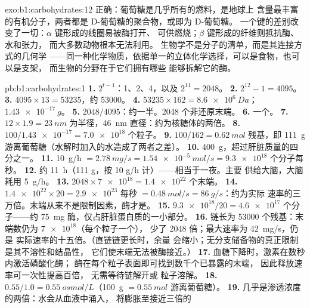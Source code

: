 \begin{solution}{exo:b1:carbohydrates:12}
正确：葡萄糖是几乎所有的燃料，是地球上
含量最丰富的有机分子，两者都是 D-葡萄糖的聚合物，或即为 D-葡萄糖。
一个键的差别改变了一切：$\alpha$ 键形成的线圈易被酶打开、
可供燃烧；$\beta$ 键形成的纤维则抵抗酶、水和张力，
而大多数动物根本无法利用。
生物学不是分子的清单，而是其连接方式的几何学
——同一种化学物质，依据单一的立体化学选择，可以是食物，也可以是支架，
而生物的分野在于它们拥有哪些
能够拆解它的酶。
\end{solution}

\begin{solution}{pb:b1:carbohydrates:1}
\textbf{1.} $2^{t-1}$：1、2、4，以及 $2^{11} = 2048$。
\textbf{2.} $2^{12} - 1 = 4095$。
\textbf{3.} $4095\times 13 = \num{53235}$，约 \num{53000}。
\textbf{4.} $\num{53235}\times 162 = \qty{8.6e6}{Da}$；
$\qty{1.43e-17}{g}$。
\textbf{5.} $2048/4095$：约一半。\num{2048} 个非还原末端。
\textbf{6.} 一个。
\textbf{7.} $12\times 1.9 = \qty{23}{nm}$ 为半径，\qty{46}{nm}
直径：约为核糖体的两倍。
\textbf{8.} $100/\num{1.43e-17} = \num{7.0e18}$ 个粒子。
\textbf{9.} $100/162 = \qty{0.62}{mol}$ 残基，即 \qty{111}{g}
游离葡萄糖（水解时加入的水造成了两者之差）。
\textbf{10.} \qty{400}{g}，超过肝脏质量的四分之一。
\textbf{11.} \qty{10}{g/h} $= \qty{2.78}{mg/s} = \qty{1.54e-5}{mol/s} =
\num{9.3e18}$ 个分子每秒。
\textbf{12.} 约 \qty{11}{h}（111 g，按 10 g/h 计）——相当于一夜。主要
供给大脑，大脑耗用 \qty{5}{g/h}。
\textbf{13.} $2048\times\num{7e18} = \num{1.4e22}$ 个末端。
\textbf{14.} $\num{1.4e22}\times 20 = \num{2.9e23}$ 每秒 $=
\qty{0.48}{mol/s} = \qty{86}{g/s}$：约为实际
速率的三万倍。末端从来不是限制因素，酶才是。
\textbf{15.} $\num{9.3e18}/20 = \num{4.6e17}$ 个分子——约
\qty{75}{mg} 酶，仅占肝脏蛋白质的一小部分。
\textbf{16.} 链长为 \num{53000} 个残基：末端数仍为 $\num{7e18}$（每个粒子一个），
少了 \num{2048} 倍；最大速率为 \qty{42}{mg/s}，仍是
实际速率的十五倍。（直链链更长时，余量
会缩小；无分支储备物的真正限制是其不溶性和结晶性，
它们使末端无法被酶接近。）
\textbf{17.} 血糖下降时，激素在数秒内激活磷酸化酶；
酶在每个粒子表面即可找到数千个已暴露的末端，
因此释放速率可一次性提高百倍，
无需等待链解开或
粒子溶解。
\textbf{18.} $0.55/1.0 = \qty{0.55}{osmol/L}$（\qty{100}{g}
$= \qty{0.55}{mol}$ 游离葡萄糖）。
\textbf{19.} 几乎是渗透浓度的两倍：水会从血液中涌入，
将膨胀至接近三倍的

\end{solution}
